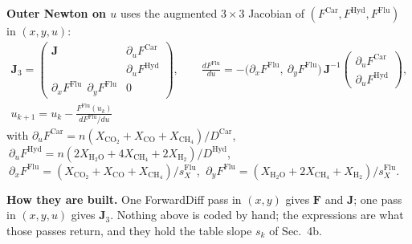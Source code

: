 \documentclass[11pt]{article}
\begin{document}
\begin{minipage}[t]{\linewidth}
\bigskip
\textbf{Outer Newton on $u$} uses the augmented $3\times3$ Jacobian of $(F^{\mathrm{Car}},F^{\mathrm{Hyd}},F^{\mathrm{Flu}})$ in $(x,y,u)$:
\begin{gather}
  \mathbf J_3=
  \begin{pmatrix}
    \mathbf J & \partial_u F^{\mathrm{Car}}\\ & \partial_u F^{\mathrm{Hyd}}\\
    \partial_x F^{\mathrm{Flu}}\ \ \partial_y F^{\mathrm{Flu}} & 0
  \end{pmatrix},
  \qquad
  \frac{dF^{\mathrm{Flu}}}{du}=-\big(\partial_xF^{\mathrm{Flu}},\ \partial_yF^{\mathrm{Flu}}\big)\,\mathbf J^{-1}\begin{pmatrix}\partial_uF^{\mathrm{Car}}\\ \partial_uF^{\mathrm{Hyd}}\end{pmatrix},
  \nonumber\\
  u_{k+1}=u_k-\frac{F^{\mathrm{Flu}}(u_k)}{dF^{\mathrm{Flu}}/du}
\end{gather}
with $\partial_uF^{\mathrm{Car}}=n(X_{\mathrm{CO_2}}+X_{\mathrm{CO}}+X_{\mathrm{CH_4}})/D^{\mathrm{Car}}$, $\ \partial_uF^{\mathrm{Hyd}}=n(2X_{\mathrm{H_2O}}+4X_{\mathrm{CH_4}}+2X_{\mathrm{H_2}})/D^{\mathrm{Hyd}}$, $\ \partial_xF^{\mathrm{Flu}}=(X_{\mathrm{CO_2}}+X_{\mathrm{CO}}+X_{\mathrm{CH_4}})/s_X^{\mathrm{Flu}}$, $\ \partial_yF^{\mathrm{Flu}}=(X_{\mathrm{H_2O}}+2X_{\mathrm{CH_4}}+X_{\mathrm{H_2}})/s_X^{\mathrm{Flu}}$.

\bigskip
\textbf{How they are built.} One ForwardDiff pass in $(x,y)$ gives $\mathbf F$ and $\mathbf J$; one pass in $(x,y,u)$ gives $\mathbf J_3$. Nothing above is coded by hand; the expressions are what those passes return, and they hold the table slope $s_k$ of Sec.~4b.
\end{minipage}


\vspace*{\fill}
\clearpage
\end{document}
